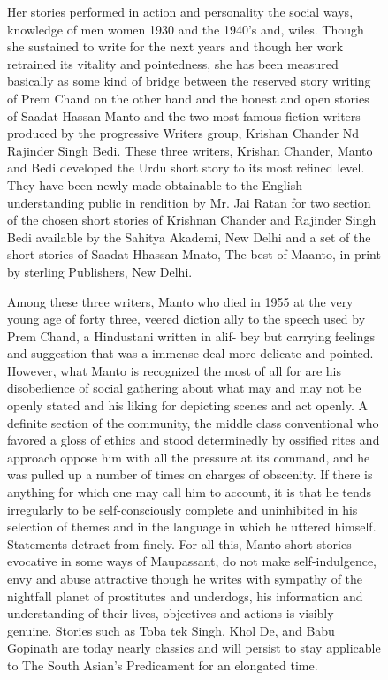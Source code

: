 {\begin{figure}[p]
    Her stories performed in action and personality the social ways, knowledge of men women 1930 and the 1940's and, wiles. 
    Though she sustained to write for the next years and though her work retrained its vitality and pointedness, she has been measured basically as some kind of bridge between the reserved story writing of Prem Chand on the other hand and the honest and open stories of Saadat Hassan Manto and the two most famous fiction writers produced by the progressive Writers group, Krishan Chander Nd Rajinder Singh Bedi. 
    These three writers, Krishan Chander, Manto and Bedi developed the Urdu short story to its most refined level. 
    They have been newly made obtainable to the English understanding public in rendition by Mr. Jai Ratan for two section of the chosen short stories of Krishnan Chander and Rajinder Singh Bedi available by the Sahitya Akademi, New Delhi and a set of the short stories of Saadat Hhassan Mnato, The best of Maanto, in print by sterling Publishers, New Delhi.


    Among these three writers, Manto who died in 1955 at the very young age of forty three, veered diction ally to the speech used by Prem Chand, a Hindustani written in alif- bey but carrying feelings and suggestion that was a immense deal more delicate and pointed. 
    However, what Manto is recognized the most of all for are his disobedience of social gathering about what may and may not be openly stated and his liking for depicting scenes and act openly. 
    A definite section of the community, the middle class conventional who favored a gloss of ethics and stood determinedly by ossified rites and approach oppose him with all the pressure at its command, and he was pulled up a number of times on charges of obscenity. 
    If there is anything for which one may call him to account, it is that he tends irregularly to be self-consciously complete and uninhibited in his selection of themes and in the language in which he uttered himself. 
    Statements detract from finely. 
    For all this, Manto short stories evocative in some ways of Maupassant, do not make self-indulgence, envy and abuse attractive though he writes with sympathy of the nightfall planet of prostitutes and underdogs, his information and understanding of their lives, objectives and actions is visibly genuine. 
    Stories such as Toba tek Singh, Khol De, and Babu Gopinath are today nearly classics and will persist to stay applicable to The South Asian's Predicament for an elongated time.
\end{figure}

}
